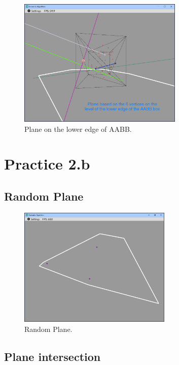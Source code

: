 \documentclass[12pt,a4paper,english]{article}
\begin{document}
\begin{figure}[H]
    \centering
    \includegraphics[width=0.7\textwidth]{p2a-6}
    \caption[]{Plane on the lower edge of AABB.}
    \label{fig:p2a-6}
\end{figure}

\newpage

\section{Practice 2.b}
\subsection{Random Plane}

\begin{figure}[H]
    \centering
    \includegraphics[width=0.65\textwidth]{p2b-1}
    \caption[]{Random Plane.}
    \label{fig:p2b-1}
\end{figure}

\subsection{Plane intersection}
\end{document}

